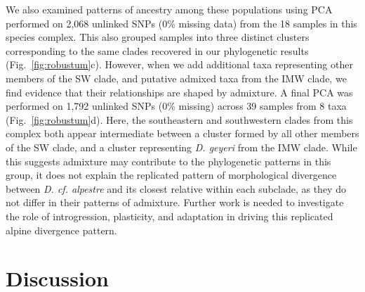 \documentclass[11pt]{article}
\begin{document}
%  

% 
We also examined patterns of ancestry among these populations using PCA performed
on 2,068 unlinked SNPs (0\% missing data) from the 18 samples in this species complex.
This also grouped samples into three distinct clusters corresponding to the same clades recovered in our phylogenetic results (Fig.~\ref{fig:robustum}c).
% 
However, when we add additional taxa representing other members of the SW clade, and
putative admixed taxa from the IMW clade, we find evidence that their relationships are shaped by admixture.
% 
A final PCA was performed on 1,792 unlinked SNPs (0\% missing) across 39 samples 
from 8 taxa (Fig.~\ref{fig:robustum}d). 
Here, the southeastern and southwestern clades from this complex both appear intermediate between a cluster formed by all other members of the SW clade, and a cluster representing \emph{D. geyeri} from the IMW clade.
% 
% 
While this suggests admixture may contribute to the phylogenetic patterns in this group, it does not explain the replicated pattern of morphological divergence 
between \emph{D. cf. alpestre} and its closest relative within each subclade, as they do not differ in their patterns of admixture.
Further work is needed to investigate the role of introgression, plasticity, and adaptation in driving this replicated alpine divergence pattern.


\section{Discussion}
\end{document}
